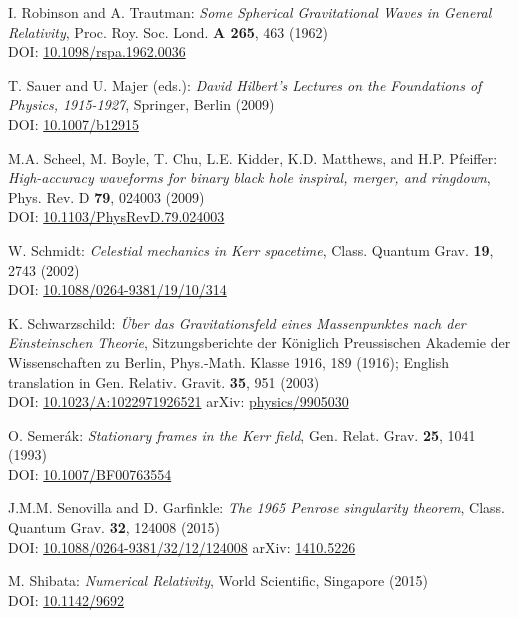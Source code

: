 \begin{thebibliography}{123}
I. Robinson and A. Trautman: {\em Some Spherical Gravitational Waves in General Relativity},
Proc. Roy. Soc. Lond. {\bf A 265}, 463 (1962)\\
DOI: \href{https://doi.org/10.1098/rspa.1962.0036}{10.1098/rspa.1962.0036}

T. Sauer and U. Majer (eds.):
{\em David Hilbert’s Lectures on the Foundations of Physics, 1915-1927},
Springer, Berlin (2009)\\
DOI: \href{https://doi.org/10.1007/b12915}{10.1007/b12915}

M.A. Scheel, M. Boyle, T. Chu, L.E. Kidder, K.D. Matthews, and H.P. Pfeiffer:
{\em High-accuracy waveforms for binary black hole inspiral, merger, and ringdown},
Phys. Rev. D {\bf 79}, 024003 (2009)\\
DOI: \href{https://doi.org/10.1103/PhysRevD.79.024003}{10.1103/PhysRevD.79.024003}

W. Schmidt:
{\em Celestial mechanics in Kerr spacetime},
Class. Quantum Grav. {\bf 19}, 2743 (2002)\\
DOI: \href{https://doi.org/10.1088/0264-9381/19/10/314}{10.1088/0264-9381/19/10/314}

K. Schwarzschild:
{\em \"Uber das Gravitationsfeld eines Massenpunktes nach der Einsteinschen Theorie},
Sitzungsberichte der K\"oniglich Preussischen Akademie der Wissenschaften zu Berlin, Phys.-Math. Klasse 1916, 189 (1916);
English translation in Gen. Relativ. Gravit. {\bf 35}, 951 (2003)\\
DOI: \href{https://doi.org/10.1023/A:1022971926521}{10.1023/A:1022971926521}\hfill
arXiv: \href{https://arxiv.org/abs/physics/9905030}{physics/9905030}

O. Semer\'ak:
{\em Stationary frames in the Kerr field},
Gen. Relat. Grav. {\bf 25}, 1041 (1993)\\
DOI: \href{https://doi.org/10.1007/BF00763554}{10.1007/BF00763554}

J.M.M. Senovilla and D. Garfinkle:
{\em The 1965 Penrose singularity theorem},
Class. Quantum Grav. {\bf 32}, 124008 (2015)\\
DOI: \href{https://doi.org/10.1088/0264-9381/32/12/124008}{10.1088/0264-9381/32/12/124008}\hfill
arXiv: \href{https://arxiv.org/abs/1410.5226}{1410.5226}

M. Shibata:
{\em Numerical Relativity},
World Scientific, Singapore (2015)\\
DOI: \href{https://doi.org/10.1142/9692}{10.1142/9692}


\end{thebibliography}
